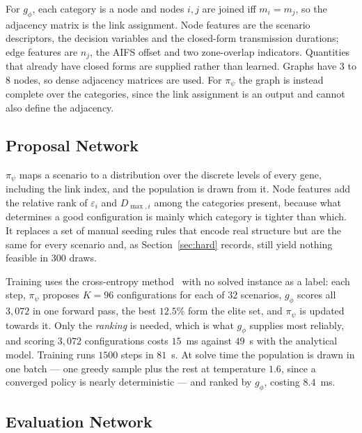 \documentclass[journal,a4paper,comsoc,twocolumn]{IEEEtran}
\begin{document}
For $g_\phi$, each category is a node and nodes $i,j$ are joined iff
$m_i = m_j$, so the adjacency matrix is the link assignment. Node features are
the scenario descriptors, the decision variables and the closed-form
transmission durations; edge features are $n_j$, the AIFS offset and two
zone-overlap indicators. Quantities that already have closed forms are supplied
rather than learned. Graphs have $3$ to $8$ nodes, so dense adjacency matrices
are used. For $\pi_\psi$ the graph is instead complete over the categories,
since the link assignment is an output and cannot also define the adjacency.

\subsection{Proposal Network}
\label{sec:propose}

$\pi_\psi$ maps a scenario to a distribution over the discrete levels of every
gene, including the link index, and the population is drawn from it. Node
features add the relative rank of $\varepsilon_i$ and $D_{\max,i}$ among the
categories present, because what determines a good configuration is mainly which
category is tighter than which. It replaces a set of manual seeding rules that
encode real structure but are the same for every scenario and, as
Section~\ref{sec:hard} records, still yield nothing feasible in $300$ draws.

Training uses the cross-entropy method~\cite{DeBoer2005} with no solved
instance as a label: each step, $\pi_\psi$ proposes $K = 96$ configurations for
each of $32$ scenarios, $g_\phi$ scores all $3{,}072$ in one forward pass, the
best $12.5\%$ form the elite set, and $\pi_\psi$ is updated towards it. Only the
\emph{ranking} is needed, which is what $g_\phi$ supplies most reliably, and
scoring $3{,}072$ configurations costs $15$~ms against $49$~s with the
analytical model. Training runs $1500$ steps in $81$~s. At solve time the
population is drawn in one batch --- one greedy sample plus the rest at
temperature $1.6$, since a converged policy is nearly deterministic --- and
ranked by $g_\phi$, costing $8.4$~ms.

\subsection{Evaluation Network}
\label{sec:evaluate}
\end{document}

